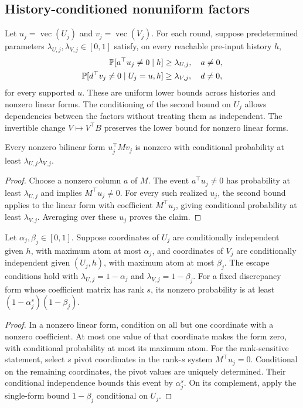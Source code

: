 \subsection{History-conditioned nonuniform factors}\label{sec:escape}
Let $u_j=\operatorname{vec}(U_j)$ and $v_j=\operatorname{vec}(V_j)$.
For each round, suppose predetermined parameters
$\lambda_{U,j},\lambda_{V,j}\in[0,1]$ satisfy, on every reachable pre-input history $h$,
\begin{align*}
\mathbb P[a^\top u_j\ne0\mid h]&\ge\lambda_{U,j},\quad a\ne0,\\
\mathbb P[d^\top v_j\ne0\mid U_j=u,h]&\ge\lambda_{V,j},\quad d\ne0,
\end{align*}
for every supported $u$. These are uniform lower bounds across histories
and nonzero linear forms. The conditioning of the second bound on $U_j$
allows dependencies between the factors without treating them as
independent. The invertible change $V\mapsto V^\top B$ preserves
the lower bound for nonzero linear forms.

\begin{lemma}\label{lem:conditional-escape}
Every nonzero bilinear form $u_j^\top Mv_j$ is nonzero with
conditional probability at least $\lambda_{U,j}\lambda_{V,j}$.
\end{lemma}
\begin{proof}
Choose a nonzero column $a$ of $M$. The event $a^\top u_j\ne0$
has probability at least $\lambda_{U,j}$ and implies $M^\top u_j\ne0$.
For every such realized $u_j$, the second bound applies to the linear
form with coefficient $M^\top u_j$, giving conditional probability at
least $\lambda_{V,j}$. Averaging over these $u_j$ proves the claim.
\end{proof}

\begin{corollary}\label{cor:coordinate-escape}
Let $\alpha_j,\beta_j\in[0,1]$. Suppose coordinates of $U_j$ are conditionally independent given $h$,
with maximum atom at most $\alpha_j$, and coordinates of $V_j$ are
conditionally independent given $(U_j,h)$, with maximum atom at most
$\beta_j$. The escape conditions hold with
$\lambda_{U,j}=1-\alpha_j$ and $\lambda_{V,j}=1-\beta_j$.
For a fixed discrepancy form whose
coefficient matrix has rank $s$, its nonzero probability is at least
$(1-\alpha_j^s)(1-\beta_j)$.
\end{corollary}
\begin{proof}
In a nonzero linear form, condition on all but one coordinate with a
nonzero coefficient. At most one value of that coordinate makes the
form zero, with conditional probability at most its maximum atom.
For the rank-sensitive statement, select $s$ pivot coordinates in the
rank-$s$ system $M^\top u_j=0$. Conditional on the remaining
coordinates, the pivot values are uniquely determined. Their conditional
independence bounds this event by $\alpha_j^s$. On its complement,
apply the single-form bound $1-\beta_j$ conditional on $U_j$.
\end{proof}

